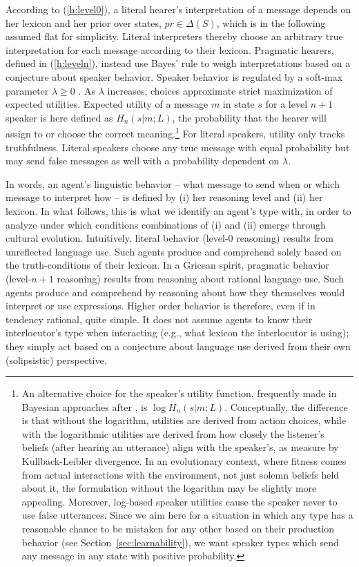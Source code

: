\documentclass[a4paper, 11pt]{article}
\theoremstyle{Satz}
\newcommand{\state}{\ensuremath{s}\xspace}		%
\newcommand{\messg}{\ensuremath{m}\xspace}		%
\begin{document}
According to (\ref{h:level0}), a literal hearer's interpretation of a message depends on her
lexicon and her prior over states, $pr \in \Delta(S)$, which is in the following assumed flat for
simplicity. Literal interpreters thereby choose an arbitrary true interpretation for each
message according to their lexicon. Pragmatic hearers, defined in (\ref{h:leveln}), instead use
Bayes' rule to weigh interpretations based on a conjecture about speaker behavior. Speaker
behavior is regulated by a soft-max parameter $\lambda \geq 0$
\citep{luce:1959,sutton+barto:1998}. As $\lambda$ increases, choices approximate strict
maximization of expected utilities. Expected utility of a message $\messg$ in state $\state$
for a level $n+1$ speaker is here defined as $H_{n}(s|m;L)$, the probability that the hearer
will assign to or choose the correct meaning.\footnote{An alternative choice for the speaker's
  utility function, frequently made in Bayesian approaches after \citet{frank+goodman:2012}, is
  $\log H_{n}(s|m;L)$. Conceptually, the difference is that without the logarithm, utilities
  are derived from action choices, while with the logarithmic utilities are derived from how
  closely the listener's beliefs (after hearing an utterance) align with the speaker's, as
  measure by Kullback-Leibler divergence. In an evolutionary context, where fitness comes from
  actual interactions with the environment, not just solemn beliefs held about it, the
  formulation without the logarithm may be slightly more appealing. Moreover, log-based speaker
  utilities cause the speaker never to use false utterances. Since we aim here for a situation
  in which any type has a reasonable chance to be mistaken for any other based on their
  production behavior (see Section~\ref{sec:learnability}), we want speaker types which send
  any message in any state with positive probability.} For literal speakers, utility only
tracks truthfulness. Literal speakers choose any true message with equal probability but may
send false messages as well with a probability dependent on $\lambda$.

In words, an agent's linguistic behavior -- what message to send when or which message to
interpret how -- is defined by (i) her reasoning level and (ii) her lexicon. In what follows,
this is what we identify an agent's type with, in order to analyze under which conditions
combinations of (i) and (ii) emerge through cultural evolution. Intuitively, literal behavior
(level-$0$ reasoning) results from unreflected language use. Such agents produce and comprehend
solely based on the truth-conditions of their lexicon. In a Gricean spirit, pragmatic behavior
(level-$n+1$ reasoning) results from reasoning about rational language use. Such agents produce
and comprehend by reasoning about how they themselves would interpret or use
expressions. Higher order behavior is therefore, even if in tendency rational, quite simple. It
does not assume agents to know their interlocutor's type when interacting (e.g., what
lexicon the interlocutor is using); they simply act based on a conjecture about language use
derived from their own (solipsistic) perspective.
\end{document}

